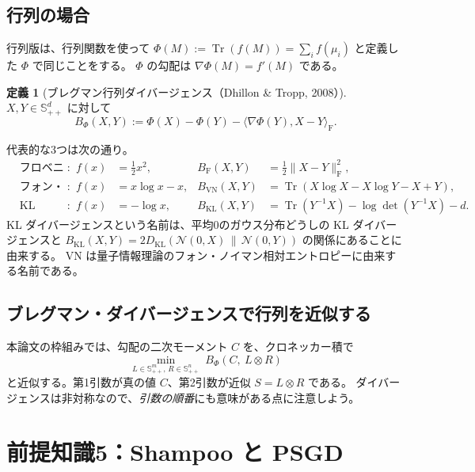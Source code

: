 \documentclass[a4paper,11pt]{ltjsarticle}
\theoremstyle{definition}
\newtheorem{definition}{定義}[section]
\theoremstyle{plain}
\newcommand{\Spd}[1]{\mathbb{S}^{#1}_{++}}
\DeclareMathOperator{\Tr}{Tr}
\newcommand{\ip}[2]{\langle #1,#2\rangle}
\newcommand{\norm}[1]{\lVert #1\rVert}
\newcommand{\Fro}{\mathrm{F}}
\begin{document}
\subsection{行列の場合}

行列版は、行列関数を使って $\Phi(M) := \Tr(f(M)) = \sum_i f(\mu_i)$ と定義した $\Phi$ で同じことをする。
$\Phi$ の勾配は $\nabla\Phi(M) = f'(M)$ である。

\begin{definition}[ブレグマン行列ダイバージェンス（Dhillon \& Tropp, 2008）]
$X, Y\in\Spd{d}$ に対して
\begin{equation}\label{eq:matrix-bregman}
  B_\Phi(X, Y) := \Phi(X) - \Phi(Y) - \ip{\nabla\Phi(Y)}{X-Y}_\Fro .
\end{equation}
\end{definition}
代表的な3つは次の通り。
\begin{align}
  &\text{フロベニウス (F)}: & f(x)&=\tfrac12x^2, & B_{\mathrm F}(X,Y) &= \tfrac12\norm{X-Y}_\Fro^2,\\
  &\text{フォン・ノイマン (VN)}: & f(x)&=x\log x - x, & B_{\mathrm{VN}}(X,Y) &= \Tr(X\log X - X\log Y - X + Y),\\
  &\text{KL (LogDet)}: & f(x)&=-\log x, & B_{\mathrm{KL}}(X,Y) &= \Tr(Y^{-1}X) - \log\det(Y^{-1}X) - d.
\end{align}
KL ダイバージェンスという名前は、平均0のガウス分布どうしの KL ダイバージェンスと
$B_{\mathrm{KL}}(X,Y) = 2D_{\mathrm{KL}}(\mathcal N(0,X)\,\|\,\mathcal N(0,Y))$ の関係にあることに由来する。
VN は量子情報理論のフォン・ノイマン相対エントロピーに由来する名前である。

\subsection{ブレグマン・ダイバージェンスで行列を近似する}

本論文の枠組みでは、勾配の二次モーメント $C$ を、クロネッカー積で
\begin{equation}\label{eq:bregman-kron}
  \min_{L\in\Spd{m},\,R\in\Spd{n}}\ B_\Phi(C,\ L\otimes R)
\end{equation}
と近似する。第1引数が真の値 $C$、第2引数が近似 $S = L\otimes R$ である。
ダイバージェンスは非対称なので、\emph{引数の順番}にも意味がある点に注意しよう。

\section{前提知識5：Shampoo と PSGD}\label{sec:prereq-shampoo}
\end{document}
